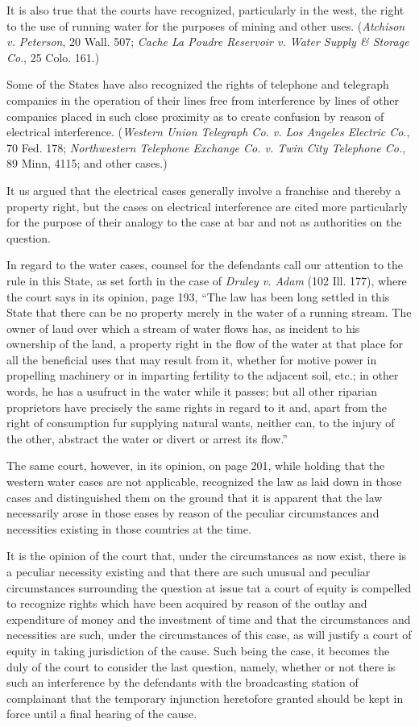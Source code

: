 It is also true that the courts have recognized, particularly in the west, the
right to the use of running water for the purposes of mining and other uses.
(\textit{Atchison v. Peterson}, 20 Wall. 507; \textit{Cache La Poudre Reservoir
v. Water Supply \& Storage Co}., 25 Colo. 161.)

Some of the States have also recognized the rights of telephone and telegraph
companies in the operation of their lines free from interference by lines of
other companies placed in such close proximity as to create confusion by reason
of electrical interference. (\textit{Western Union Telegraph Co. v. Los Angeles
Electric Co}., 70 Fed. 178; \textit{Northwestern Telephone Exchange Co. v.
Twin City Telephone Co.}, 89 Minn, 4115; and other cases.)

It us argued that the electrical cases generally involve a franchise
and thereby a property right, but the cases on electrical interference are
cited more particularly for the purpose of their analogy to the case at bar and
not as authorities on the question.

In regard to the water cases, counsel for the defendants call our attention to
the rule in this State, as set forth in the case of \textit{Druley v. Adam}
(102 Ill. 177), where the court says in its opinion, page 193, ``The law has
been long settled in this State that there can be no property merely in the
water of a running stream. The owner of laud over which a stream of water flows
has, as incident to his ownership of the land, a property right in the flow of
the water at that place for all the beneficial uses that may result from it,
whether for motive power in propelling machinery or in imparting fertility to
the adjacent soil, etc.; in other words, he has a usufruct in the water
while it passes; but all other riparian proprietors have precisely the same
rights in regard to it and, apart from the right of consumption fur supplying
natural wants, neither can, to the injury of the other, abstract the water or
divert or arrest its flow.''

The same court, however, in its opinion, on page 201, while holding that the
western water cases are not applicable, recognized the law as laid down in
those cases and distinguished them on the ground that it is apparent that the
law necessarily arose in those eases by reason of the peculiar circumstances
and necessities existing in those countries at the time.

It is the opinion of the court that, under the circumstances as now exist, there
is a peculiar necessity existing and that there are such unusual and peculiar
circumstances surrounding the question at issue tat a court of equity is
compelled to recognize rights which have been acquired by reason of the outlay
and expenditure of money and the investment of time and that the
circumstances and necessities are such, under the circumstances of this case,
as will justify a court of equity in taking jurisdiction of the cause. Such
being the case, it becomes the duly of the court to consider the last question,
namely, whether or not there is such an interference by the defendants with the
broadcasting station of complainant that the temporary injunction
heretofore granted should be kept in force until a final hearing of the
cause.

